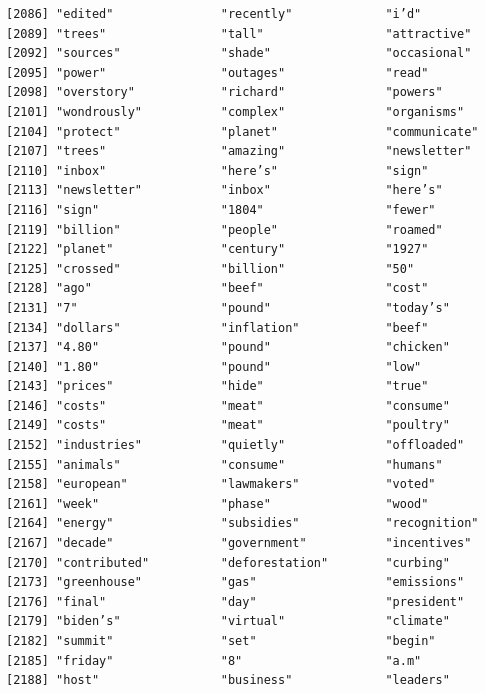 \documentclass[
  letterpaper,
  DIV=11,
  numbers=noendperiod]{scrartcl}
\begin{document}
\begin{verbatim}
[2086] "edited"               "recently"             "i’d"                 
[2089] "trees"                "tall"                 "attractive"          
[2092] "sources"              "shade"                "occasional"          
[2095] "power"                "outages"              "read"                
[2098] "overstory"            "richard"              "powers"              
[2101] "wondrously"           "complex"              "organisms"           
[2104] "protect"              "planet"               "communicate"         
[2107] "trees"                "amazing"              "newsletter"          
[2110] "inbox"                "here’s"               "sign"                
[2113] "newsletter"           "inbox"                "here’s"              
[2116] "sign"                 "1804"                 "fewer"               
[2119] "billion"              "people"               "roamed"              
[2122] "planet"               "century"              "1927"                
[2125] "crossed"              "billion"              "50"                  
[2128] "ago"                  "beef"                 "cost"                
[2131] "7"                    "pound"                "today’s"             
[2134] "dollars"              "inflation"            "beef"                
[2137] "4.80"                 "pound"                "chicken"             
[2140] "1.80"                 "pound"                "low"                 
[2143] "prices"               "hide"                 "true"                
[2146] "costs"                "meat"                 "consume"             
[2149] "costs"                "meat"                 "poultry"             
[2152] "industries"           "quietly"              "offloaded"           
[2155] "animals"              "consume"              "humans"              
[2158] "european"             "lawmakers"            "voted"               
[2161] "week"                 "phase"                "wood"                
[2164] "energy"               "subsidies"            "recognition"         
[2167] "decade"               "government"           "incentives"          
[2170] "contributed"          "deforestation"        "curbing"             
[2173] "greenhouse"           "gas"                  "emissions"           
[2176] "final"                "day"                  "president"           
[2179] "biden’s"              "virtual"              "climate"             
[2182] "summit"               "set"                  "begin"               
[2185] "friday"               "8"                    "a.m"                 
[2188] "host"                 "business"             "leaders"             

\end{verbatim}
\end{document}
